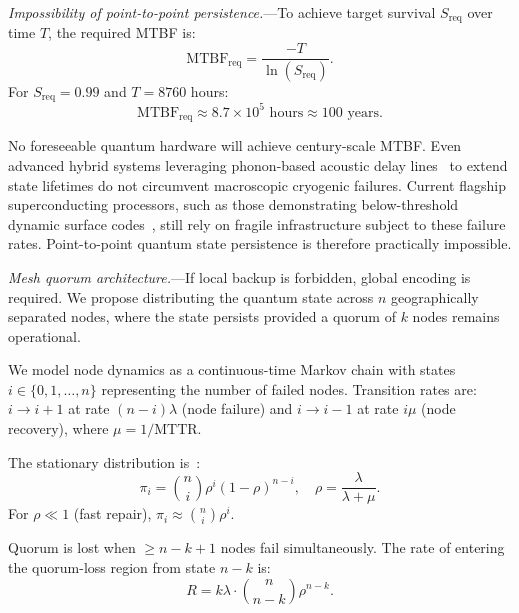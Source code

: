 \documentclass[aps,prl,twocolumn,superscriptaddress,showpacs]{revtex4-2}
\begin{document}
\textit{Impossibility of point-to-point persistence.}—To achieve target survival $S_{\text{req}}$ over time $T$, the required MTBF is:
\begin{equation}
\text{MTBF}_{\text{req}} = \frac{-T}{\ln(S_{\text{req}})}.
\end{equation}
For $S_{\text{req}} = 0.99$ and $T = 8760$ hours:
\begin{equation}
\text{MTBF}_{\text{req}} \approx 8.7 \times 10^5 \text{ hours} \approx 100 \text{ years}.
\end{equation}

No foreseeable quantum hardware will achieve century-scale MTBF. Even advanced hybrid systems leveraging phonon-based acoustic delay lines~\cite{bozkurt2025} to extend state lifetimes do not circumvent macroscopic cryogenic failures. Current flagship superconducting processors, such as those demonstrating below-threshold dynamic surface codes~\cite{googleai2026}, still rely on fragile infrastructure subject to these failure rates. Point-to-point quantum state persistence is therefore practically impossible.


\textit{Mesh quorum architecture.}—If local backup is forbidden, global encoding is required. We propose distributing the quantum state across $n$ geographically separated nodes, where the state persists provided a quorum of $k$ nodes remains operational.

We model node dynamics as a continuous-time Markov chain with states $i \in \{0, 1, \ldots, n\}$ representing the number of failed nodes. Transition rates are: $i \to i+1$ at rate $(n-i)\lambda$ (node failure) and $i \to i-1$ at rate $i\mu$ (node recovery), where $\mu = 1/\text{MTTR}$.

The stationary distribution is~\cite{ross1996}:
\begin{equation}
\pi_i = \binom{n}{i} \rho^i (1-\rho)^{n-i}, \quad \rho = \frac{\lambda}{\lambda + \mu}.
\end{equation}
For $\rho \ll 1$ (fast repair), $\pi_i \approx \binom{n}{i} \rho^i$.

Quorum is lost when $\geq n - k + 1$ nodes fail simultaneously. The rate of entering the quorum-loss region from state $n-k$ is:
\begin{equation}
R = k \lambda \cdot \binom{n}{n-k} \rho^{n-k}.
\end{equation}
\end{document}
